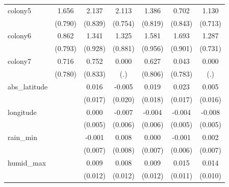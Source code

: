 \begin{table}[htbp]
\begin{tabular}{l*{6}{c}}
colony5     &       1.656\sym{**} &       2.137\sym{**} &       2.113\sym{***}&       1.386         &       0.702         &       1.130         \\
            &     (0.790)         &     (0.839)         &     (0.754)         &     (0.819)         &     (0.843)         &     (0.713)         \\
\addlinespace
colony6     &       0.862         &       1.341         &       1.325         &       1.581         &       1.693\sym{*}  &       1.287\sym{*}  \\
            &     (0.793)         &     (0.928)         &     (0.881)         &     (0.956)         &     (0.901)         &     (0.731)         \\
\addlinespace
colony7     &       0.716         &       0.752         &       0.000         &       0.627         &       0.043         &       0.000         \\
            &     (0.780)         &     (0.833)         &         (.)         &     (0.806)         &     (0.783)         &         (.)         \\
\addlinespace
abs\_latitude&                     &       0.016         &      -0.005         &       0.019         &       0.023         &       0.005         \\
            &                     &     (0.017)         &     (0.020)         &     (0.018)         &     (0.017)         &     (0.016)         \\
\addlinespace
longitude   &                     &       0.000         &      -0.007         &      -0.004         &      -0.004         &      -0.008         \\
            &                     &     (0.005)         &     (0.006)         &     (0.006)         &     (0.005)         &     (0.005)         \\
\addlinespace
rain\_min    &                     &      -0.001         &       0.008         &       0.000         &      -0.001         &       0.002         \\
            &                     &     (0.007)         &     (0.008)         &     (0.007)         &     (0.006)         &     (0.007)         \\
\addlinespace
humid\_max   &                     &       0.009         &       0.008         &       0.009         &       0.015         &       0.014         \\
            &                     &     (0.012)         &     (0.012)         &     (0.012)         &     (0.011)         &     (0.010)         \\

\end{tabular}
\end{table}

